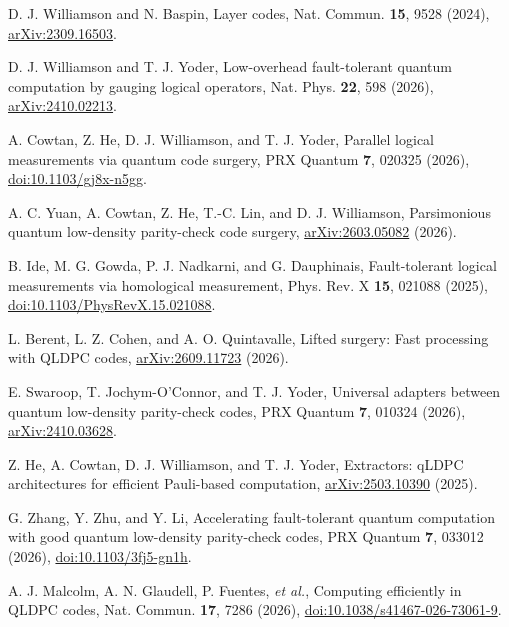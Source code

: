 
D. J. Williamson and N. Baspin, Layer codes, Nat. Commun. \textbf{15}, 9528 (2024), \href{https://arxiv.org/abs/2309.16503}{arXiv:2309.16503}.

D. J. Williamson and T. J. Yoder, Low-overhead fault-tolerant quantum computation by gauging logical operators, Nat. Phys. \textbf{22}, 598 (2026), \href{https://arxiv.org/abs/2410.02213}{arXiv:2410.02213}.

A. Cowtan, Z. He, D. J. Williamson, and T. J. Yoder, Parallel logical measurements via quantum code surgery, PRX Quantum \textbf{7}, 020325 (2026), \href{https://doi.org/10.1103/gj8x-n5gg}{doi:10.1103/gj8x-n5gg}.

A. C. Yuan, A. Cowtan, Z. He, T.-C. Lin, and D. J. Williamson, Parsimonious quantum low-density parity-check code surgery, \href{https://arxiv.org/abs/2603.05082}{arXiv:2603.05082} (2026).

B. Ide, M. G. Gowda, P. J. Nadkarni, and G. Dauphinais, Fault-tolerant logical measurements via homological measurement, Phys. Rev. X \textbf{15}, 021088 (2025), \href{https://doi.org/10.1103/PhysRevX.15.021088}{doi:10.1103/PhysRevX.15.021088}.

L. Berent, L. Z. Cohen, and A. O. Quintavalle, Lifted surgery: Fast processing with QLDPC codes, \href{https://arxiv.org/abs/2609.11723}{arXiv:2609.11723} (2026).

E. Swaroop, T. Jochym-O'Connor, and T. J. Yoder, Universal adapters between quantum low-density parity-check codes, PRX Quantum \textbf{7}, 010324 (2026), \href{https://arxiv.org/abs/2410.03628}{arXiv:2410.03628}.

Z. He, A. Cowtan, D. J. Williamson, and T. J. Yoder, Extractors: qLDPC architectures for efficient Pauli-based computation, \href{https://arxiv.org/abs/2503.10390}{arXiv:2503.10390} (2025).

G. Zhang, Y. Zhu, and Y. Li, Accelerating fault-tolerant quantum computation with good quantum low-density parity-check codes, PRX Quantum \textbf{7}, 033012 (2026), \href{https://doi.org/10.1103/3fj5-gn1h}{doi:10.1103/3fj5-gn1h}.

A. J. Malcolm, A. N. Glaudell, P. Fuentes, \emph{et al.}, Computing efficiently in QLDPC codes, Nat. Commun. \textbf{17}, 7286 (2026), \href{https://doi.org/10.1038/s41467-026-73061-9}{doi:10.1038/s41467-026-73061-9}.

